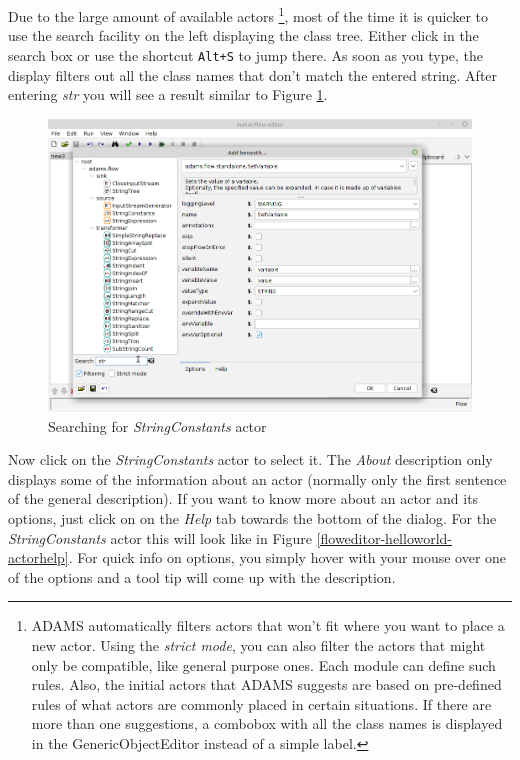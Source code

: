Due to the large amount of available actors \footnote{ADAMS automatically
filters actors that won't fit where you want to place a new actor. Using the
\textit{strict mode}, you can also filter the actors that might only be
compatible, like general purpose ones. Each module can define such rules. Also,
the initial actors that ADAMS suggests are based on pre-defined rules of what
actors are commonly placed in certain situations. If there are more than one
suggestions, a combobox with all the class names is displayed in the
GenericObjectEditor instead of a simple label.}, most of the time it is quicker
to use the search facility on the left displaying the class tree. Either click
in the search box or use the shortcut \texttt{Alt+S} to jump there. As soon as
you type, the display filters out all the class names that don't match the
entered string. After entering \textit{str} you will see a result similar to
Figure \ref{floweditor-helloworld-addactor3}.

\begin{figure}[htb]
  \centering
  \includegraphics[width=12.0cm]{images/floweditor-helloworld-addactor3.png}
  \caption{Searching for \textit{StringConstants} actor}
  \label{floweditor-helloworld-addactor3}
\end{figure}

Now click on the \textit{StringConstants} actor to select it. The \textit{About}
description only displays some of the information about an actor (normally only
the first sentence of the general description). If you want to know more about
an actor and its options, just click on on the \textit{Help} tab towards the bottom
of the dialog. For the \textit{StringConstants} actor this will look like in
Figure \ref{floweditor-helloworld-actorhelp}. For quick info on
options, you simply hover with your mouse over one of the options and a tool tip
will come up with the description.

